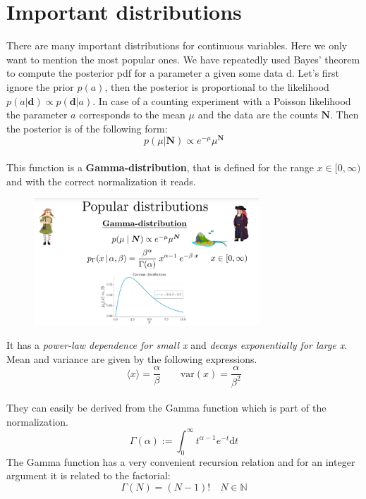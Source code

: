 \documentclass[12pt, a4paper]{scrartcl}
\begin{document}
\section*{Important distributions}
There are many important distributions for continuous variables. Here we
only want to mention the most popular ones.
We have repeatedly used Bayes’ theorem to compute the posterior pdf for a
parameter a given some data d.
Let’s first ignore the prior $p(a)$, then the posterior is proportional to the likelihood $p(a|\boldsymbol{d})\propto p(\boldsymbol{d}|a)$.
In case of a counting experiment with a Poisson likelihood the parameter
$a$ corresponds to the mean $\mu$ and the data are the counts $\boldsymbol{N}$. Then the
posterior is of the following form:
\begin{equation*}\boxed{p(\mu|\boldsymbol{N})\propto e^{-\mu}\mu^\boldsymbol{N}
}\end{equation*}\\
This function is a  \textbf{Gamma-distribution}, that is defined for the range $x\in [0,\infty)$
and with the correct normalization it reads.%
 \begin{figure}[H]
	\centering
	\includegraphics[width=0.75\textwidth]{8_11.png}
\end{figure}
It has a \textit{power-law dependence for small x} and \textit{decays exponentially for large
x}. Mean and variance are given by the following expressions.
\begin{equation*}\boxed{\langle x\rangle = \frac{\alpha}{\beta} \qquad \text{var}(x)=\frac{\alpha}{\beta^2}
}\end{equation*}\\
They can easily be derived from the Gamma function which is part of
the normalization.
\[\Gamma(\alpha):=\int_0^{\infty}t^{\alpha-1}e^{-t}\text{d}t\]
The Gamma function has a very convenient recursion relation
and for an integer argument it is related to the factorial: \[\Gamma(N)=(N-1)! \quad N\in\mathbb{N}\]
\end{document}
